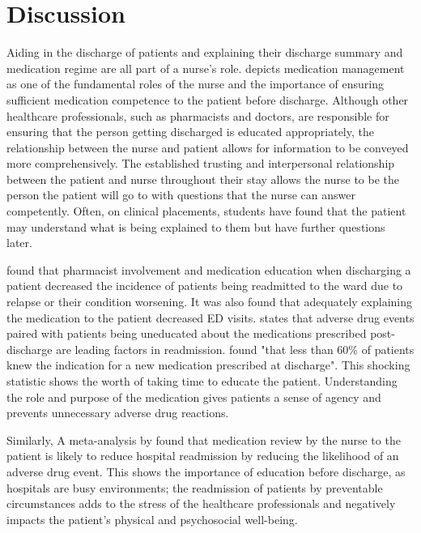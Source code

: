 \documentclass[british,12pt,a4paper]{article}
\begin{document}
\section{Discussion}
Aiding in the discharge of patients and explaining their discharge summary and medication regime are all part of a nurse's role. \textcite{Sulosaari2014} depicts medication management as one of the fundamental roles of the nurse and the importance of ensuring sufficient medication competence to the patient before discharge. Although other healthcare professionals, such as pharmacists and doctors, are responsible for ensuring that the person getting discharged is educated appropriately, the relationship between the nurse and patient allows for information to be conveyed more comprehensively. The established trusting and interpersonal relationship between the patient and nurse throughout their stay allows the nurse to be the person the patient will go to with questions that the nurse can answer competently. Often, on clinical placements, students have found that the patient may understand what is being explained to them but have further questions later.

\textcite{Phatak2015} found that pharmacist involvement and medication education when discharging a patient decreased the incidence of patients being readmitted to the ward due to relapse or their condition worsening. It was also found that adequately explaining the medication to the patient decreased ED visits. \citeauthor{Phatak2015} states that adverse drug events paired with patients being uneducated about the medications prescribed post-discharge are leading factors in readmission. \citeauthor{Phatak2015} found "that less than 60\% of patients knew the indication for a new medication prescribed at discharge". This shocking statistic shows the worth of taking time to educate the patient. Understanding the role and purpose of the medication gives patients a sense of agency and prevents unnecessary adverse drug reactions.

Similarly,  A meta-analysis by \textcite{Alper2023} found that medication review by the nurse to the patient is likely to reduce hospital readmission by reducing the likelihood of an adverse drug event. This shows the importance of education before discharge, as hospitals are busy environments; the readmission of patients by preventable circumstances adds to the stress of the healthcare professionals and negatively impacts the patient's physical and psychosocial well-being.
\end{document}
